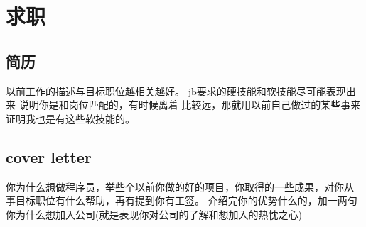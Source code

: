 
\chapter{求职}

\section{简历}

以前工作的描述与目标职位越相关越好。
jb要求的硬技能和软技能尽可能表现出来 说明你是和岗位匹配的，有时候离着
比较远，那就用以前自己做过的某些事来证明我也是有这些软技能的。

\section{cover letter}
\label{sec:cover-letter}

你为什么想做程序员，举些个以前你做的好的项目，你取得的一些成果，对你从
事目标职位有什么帮助，再有提到你有工签。
介绍完你的优势什么的，加一两句你为什么想加入公司(就是表现你对公司的了解和想加入的热忱之心)

